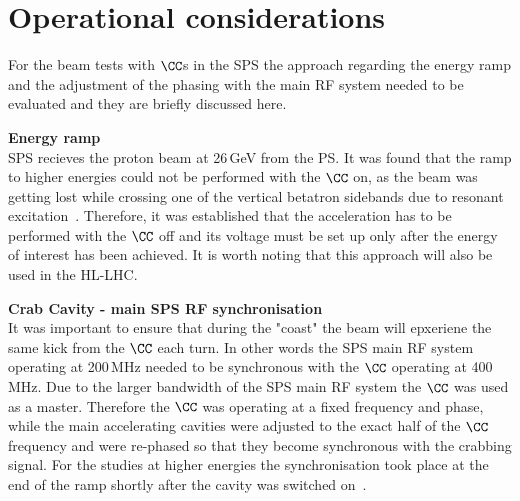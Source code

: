 
\section{Operational considerations}\label{sec:CC_operational_considerations}

For the beam tests with $\CC$s in the SPS the approach regarding the energy ramp and the adjustment of the phasing with the main RF system needed to be evaluated and they are briefly discussed here.

\normalsize{\textbf{Energy ramp}}\\
SPS recieves the proton beam at 26\,GeV from the PS. It was found that the ramp to higher energies could not be performed with the $\CC$ on, as the beam was getting lost while crossing one of the vertical betatron sidebands due to resonant excitation~\cite{Rama_Paris_persentation}. Therefore, it was established that the acceleration has to be performed with the $\CC$ off and its voltage must be set up only after the energy of interest has been achieved. It is worth noting that this approach will also be used in the HL-LHC.

\normalsize{\textbf{Crab Cavity - main SPS RF synchronisation}}\\
It was important to ensure that during the "coast" the beam will epxeriene the same kick from the $\CC$ each turn. In other words the SPS main RF system operating at 200\,MHz needed to be synchronous with the $\CC$ operating at 400\,MHz. Due to the larger bandwidth of the SPS main RF system the $\CC$ was used as a master. Therefore the $\CC$ was operating at a fixed frequency and phase, while the main accelerating cavities were adjusted to the exact half of the $\CC$ frequency and were re-phased so that they become synchronous with the crabbing signal. For the studies at higher energies the synchronisation took place at the end of the ramp shortly after the cavity was switched on~\cite{BE_seminar}.



